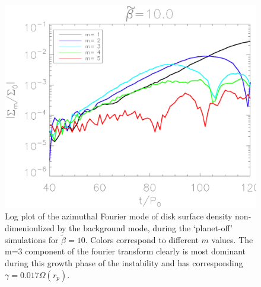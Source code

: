 \begin{figure}
  \includegraphics[width=\linewidth,clip=true,trim=1.2cm
    0cm 0cm 0cm]{figures/linear_stability}
  \caption{Log plot of the azimuthal Fourier mode of disk surface density non-dimenionlized by the background mode, during the `planet-off' simulations for $\tilde{\beta}=10$. Colors correspond to different $m$ values. The m=3 component of the fourier transform clearly is most dominant during this growth phase of the instability and has corresponding $\gamma=0.017\Omega(r_p)$. \label{linearmodes}}
\end{figure}

